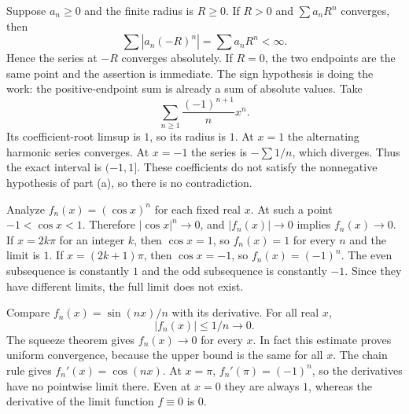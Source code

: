 Suppose $a_n\ge0$ and the finite radius is $R\ge0$. If $R>0$ and
$\sum a_nR^n$ converges, then
\[
 \sum|a_n(-R)^n|=\sum a_nR^n<\infty.
\]
Hence the series at $-R$ converges absolutely. If $R=0$, the two
endpoints are the same point and the assertion is immediate.
The sign hypothesis is doing the work: the positive-endpoint sum is
already a sum of absolute values.
Take
\[
 \sum_{n\ge1}\frac{(-1)^{n+1}}n x^n.
\]
Its coefficient-root limsup is $1$, so its radius is $1$. At $x=1$
the alternating harmonic series converges. At $x=-1$ the series is
$-\sum1/n$, which diverges. Thus the exact interval is
$\boxed{(-1,1]}$. These coefficients do not satisfy the nonnegative
hypothesis of part (a), so there is no contradiction.

\goal Analyze $f_n(x)=(\cos x)^n$ for each fixed real $x$.
At such a point $-1<\cos x<1$. Therefore $|\cos x|^n\to0$, and
$|f_n(x)|\to0$ implies $f_n(x)\to0$.
If $x=2k\pi$ for an integer $k$, then $\cos x=1$, so
$f_n(x)=1$ for every $n$ and the limit is $1$.
If $x=(2k+1)\pi$, then $\cos x=-1$, so $f_n(x)=(-1)^n$.
The even subsequence is constantly $1$ and the odd subsequence is
constantly $-1$. Since they have different limits, the full limit
does not exist.

\goal Compare $f_n(x)=\sin(nx)/n$ with its derivative.
For all real $x$,
\[
 |f_n(x)|\le1/n\longrightarrow0.
\]
The squeeze theorem gives $f_n(x)\to0$ for every $x$. In fact this
estimate proves uniform convergence, because the upper bound is the
same for all $x$.
The chain rule gives $f_n'(x)=\cos(nx)$. At $x=\pi$,
$f_n'(\pi)=(-1)^n$, so the derivatives have no pointwise limit there.
Even at $x=0$ they are always $1$, whereas the derivative of the
limit function $f\equiv0$ is $0$.

